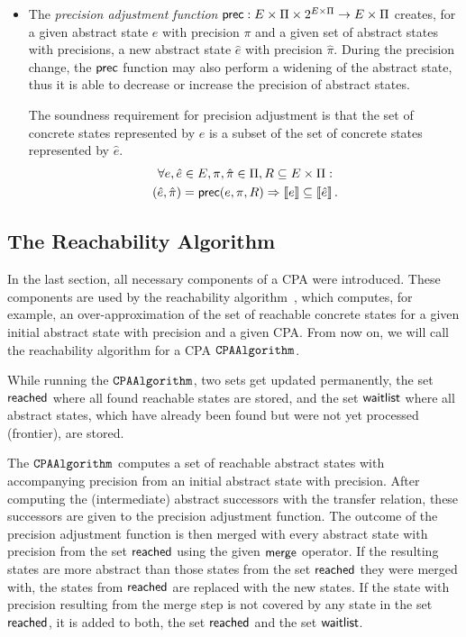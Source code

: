 \begin{itemize}
 \item The \emph{precision adjustment function} $\operatorname{\mathsf{prec}} : E \times \Pi \times 2^{E\times \Pi} \rightarrow E \times \Pi$ creates, for a given abstract state $e$ with precision $\pi$ and a given set of abstract states with precisions, a new abstract state $\hat{e}$ with precision $\hat{\pi}$. 
 During the precision change, the $\operatorname{\mathsf{prec}}$ function may also perform a widening of the abstract state, thus it is able to decrease or increase the precision of abstract states.
 
 The soundness requirement for precision adjustment is that the set of concrete states represented by $e$ is a subset of the set of concrete states represented by $\hat{e}$.
 \begin{gather*}
   \forall e, \hat{e} \in E, \pi, \hat{\pi} \in \Pi, R \subseteq E \times \Pi:\\
   (\hat{e}, \hat{\pi}) = \operatorname{\mathsf{prec}}(e, \pi, R) \Rightarrow \left\llbracket e \right\rrbracket \subseteq \left\llbracket \hat{e} \right\rrbracket.
 \end{gather*}
\end{itemize}

\subsection{The Reachability Algorithm}
In the last section, all necessary components of a \ac{CPA} were introduced. These components are used
by the reachability algorithm~\cite{Beyer:DynamicPrecisionAdjustment}, which computes, for example, an over-approximation of the set of reachable concrete states for a given initial abstract state with 
precision and a given \ac{CPA}. From now on, we will call the reachability algorithm for a \ac{CPA} $\mathtt{CPAAlgorithm}{}$.

While running the $\mathtt{CPAAlgorithm}{}$, two sets get updated permanently, the set $\operatorname{\mathsf{reached}}$ where all found reachable states are stored,
and the set $\operatorname{\mathsf{waitlist}}$ where all abstract states, which have already been found but were not yet processed (frontier), are stored.

The $\mathtt{CPAAlgorithm}{}$ computes a set of reachable abstract states with accompanying precision from an initial abstract state with precision.
After computing the (intermediate) abstract successors with the transfer relation, these successors are given to the precision adjustment function. The outcome of the precision adjustment function is then merged with every abstract state with precision from the set $\operatorname{\mathsf{reached}}$ using the given $\operatorname{\mathsf{merge}}$ operator. If the resulting states are more abstract than those states from the set $\operatorname{\mathsf{reached}}$ they were merged with, the states from $\operatorname{\mathsf{reached}}$ are replaced with the new states.
If the state with precision resulting from the merge step is not covered by any state in the set $\operatorname{\mathsf{reached}}$, it is added to both, the set $\operatorname{\mathsf{reached}}$ and the set $\operatorname{\mathsf{waitlist}}$.

